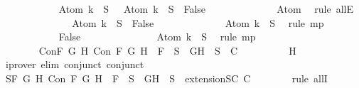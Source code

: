 \begin{isabellebody}
\ \ \ \ \ \ \ \ \ \ \isamarkupfalse%
\ {\isachardoublequoteopen}Atom\ k\ {\isasymin}\ S\ {\isasymlongrightarrow}\ \isactrlbold {\isasymnot}\ {\isacharparenleft}Atom\ k{\isacharparenright}\ {\isasymin}\ S\ {\isasymlongrightarrow}\ False{\isachardoublequoteclose}\isanewline
\ \ \ \ \ \ \ \ \ \ \ \ \isamarkupfalse%
\ Atom\ \isamarkupfalse%
\ {\isacharparenleft}rule\ allE{\isacharparenright}\isanewline
\ \ \ \ \ \ \ \ \ \ \isamarkupfalse%
\ \isamarkupfalse%
\ {\isachardoublequoteopen}\isactrlbold {\isasymnot}\ {\isacharparenleft}Atom\ k{\isacharparenright}\ {\isasymin}\ S\ {\isasymlongrightarrow}\ False{\isachardoublequoteclose}\isanewline
\ \ \ \ \ \ \ \ \ \ \ \ \isamarkupfalse%
\ {\isacartoucheopen}Atom\ k\ {\isasymin}\ S{\isacartoucheclose}\ \isamarkupfalse%
\ {\isacharparenleft}rule\ mp{\isacharparenright}\isanewline
\ \ \ \ \ \ \ \ \ \ \isamarkupfalse%
\ {\isachardoublequoteopen}False{\isachardoublequoteclose}\isanewline
\ \ \ \ \ \ \ \ \ \ \ \ \isamarkupfalse%
\ {\isacartoucheopen}\isactrlbold {\isasymnot}\ {\isacharparenleft}Atom\ k{\isacharparenright}\ {\isasymin}\ S{\isacartoucheclose}\ \isamarkupfalse%
\ {\isacharparenleft}rule\ mp{\isacharparenright}\isanewline
\ \ \ \ \ \ \ \ \isamarkupfalse%
\isanewline
\ \ \ \ \ \ \isamarkupfalse%
\isanewline
\ \ \ \ \ \ \isamarkupfalse%
\ Con{\isacharcolon}{\isachardoublequoteopen}{\isasymforall}F\ G\ H{\isachardot}\ Con\ F\ G\ H\ {\isasymlongrightarrow}\ F\ {\isasymin}\ S\ {\isasymlongrightarrow}\ {\isacharbraceleft}G{\isacharcomma}H{\isacharbraceright}\ {\isasymunion}\ S\ {\isasymin}\ C{\isachardoublequoteclose}\isanewline
\ \ \ \ \ \ \ \ \isamarkupfalse%
\ H\ \isamarkupfalse%
\ {\isacharparenleft}iprover\ elim{\isacharcolon}\ conjunct{}\ conjunct{}{\isacharparenright}\isanewline
\ \ \ \ \ \ \isamarkupfalse%
\ S{}{\isacharcolon}{\isachardoublequoteopen}{\isasymforall}F\ G\ H{\isachardot}\ Con\ F\ G\ H\ {\isasymlongrightarrow}\ F\ {\isasymin}\ S{\isacharprime}\ {\isasymlongrightarrow}\ {\isacharbraceleft}G{\isacharcomma}H{\isacharbraceright}\ {\isasymunion}\ S{\isacharprime}\ {\isasymin}\ {\isacharparenleft}extensionSC\ C{\isacharparenright}{\isachardoublequoteclose}\isanewline
\ \ \ \ \ \ \isamarkupfalse%
\ {\isacharparenleft}rule\ allI{\isacharparenright}{\isacharplus}\isanewline
\ \ \ \ \ \ \ \ \isamarkupfalse%

\end{isabellebody}
